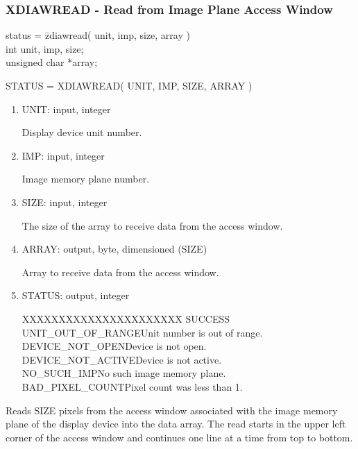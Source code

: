 \subsubsection{XDIAWREAD - Read from Image Plane Access Window}
\begin{tabbing}
status = \=zdiawread( unit, imp, size, array )\\
\>int  unit, imp, size;\\
\>unsigned char  *array;\\
\end{tabbing}
STATUS = XDIAWREAD( UNIT, IMP, SIZE, ARRAY )
\begin{enumerate}
\item UNIT:  input, integer

Display device unit number.
\item IMP:  input, integer

Image memory plane number.
\item SIZE:  input, integer

The size of the array to receive data from the access window.
\item ARRAY:  output, byte, dimensioned (SIZE)

Array to receive data from the access window.
\item STATUS:  output, integer
\begin{tabbing}
XXXXXXXXXXXXXXXXXXXXXX\=\kill
SUCCESS\\
UNIT\_OUT\_OF\_RANGE\>Unit number is out of range.\\
DEVICE\_NOT\_OPEN\>Device is not open.\\
DEVICE\_NOT\_ACTIVE\>Device is not active.\\
NO\_SUCH\_IMP\>No such image memory plane.\\
BAD\_PIXEL\_COUNT\>Pixel count was less than 1.\\
\end{tabbing}
\end{enumerate}
Reads SIZE pixels from the access window associated with the image
memory plane of the display device into the data array.  The read
starts in the upper left corner of the access window and continues
one line at a time from top to bottom.
\newpage
